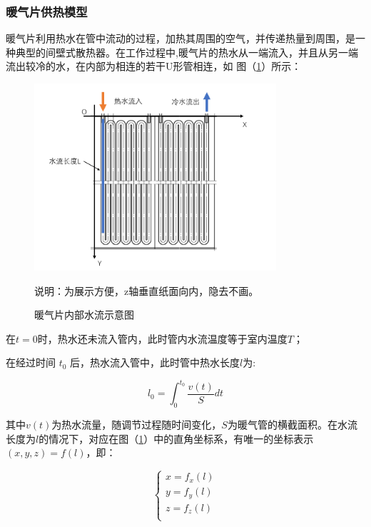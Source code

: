 \documentclass{my_paper}
\begin{document}
\subsubsection{暖气片供热模型}

暖气片利用热水在管中流动的过程，加热其周围的空气，并传递热量到周围，是一种典型的间壁式散热器\cite{2}。在工作过程中,暖气片的热水从一端流入，并且从另一端流出较冷的水，在内部为相连的若干U形管相连，如 图（\ref{nuanqipian}）所示：

\begin {figure}[h]
\centering %
\includegraphics[width=0.8\textwidth]{nuanqipian.png}

说明：为展示方便，z轴垂直纸面向内，隐去不画。
\caption{暖气片内部水流示意图} %
\label{nuanqipian}
\end {figure}

在$ t=0 $时，热水还未流入管内，此时管内水流温度等于室内温度$ T $；

在经过时间 $t_0$ 后，热水流入管中，此时管中热水长度$l$为:

\begin{equation}
l_0 = \int^{t_0}_{0}\frac{v(t)}{S}dt
\end{equation}

其中$ v(t) $为热水流量，随调节过程随时间变化，$ S $为暖气管的横截面积。在水流长度为$ l $的情况下，对应在图（\ref{nuanqipian}）中的直角坐标系，有唯一的坐标表示$(x,y,z)=f(l)$，即：

\begin{equation}
\begin{cases}
    x = f_x(l)\\
    y = f_y(l)\\
    z = f_z(l)\\
\end{cases}
\end{equation}
\end{document}
